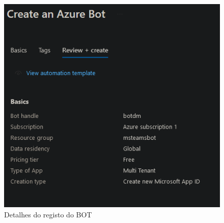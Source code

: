 \begin{figure}[H]
\begin{center}
\includegraphics[width=14cm]{figs/detalhes do bot.png}
\caption{Detalhes do registo do BOT}
\label{fig:bookstack}
\end{center}
\end{figure}


